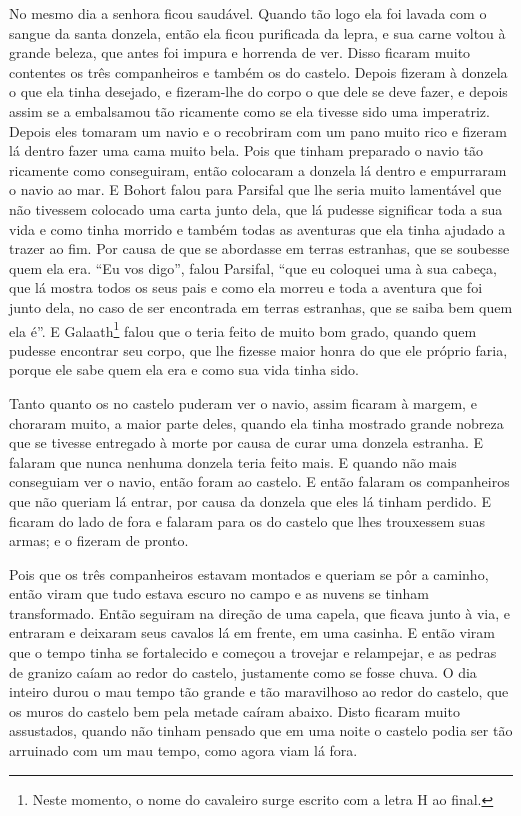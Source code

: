 No mesmo dia a senhora ficou saudável. Quando tão logo ela foi lavada com o
sangue da santa donzela, então ela ficou purificada da lepra, e sua carne
voltou à grande beleza, que antes foi impura e horrenda de ver. Disso ficaram
muito contentes os três companheiros e também os do castelo. Depois fizeram à
donzela o que ela tinha desejado, e fizeram-lhe do corpo o que dele se deve
fazer, e depois assim se a embalsamou tão ricamente como se ela tivesse sido
uma imperatriz. Depois eles tomaram um navio e o recobriram com um pano muito
rico e fizeram lá dentro fazer uma cama muito bela. Pois que tinham preparado o
navio tão ricamente como conseguiram, então colocaram a donzela lá dentro e
empurraram o navio ao mar. E Bohort falou para Parsifal que lhe seria muito
lamentável que não tivessem colocado uma carta junto dela, que lá pudesse
significar toda a sua vida e como tinha morrido e também todas as aventuras que
ela tinha ajudado a trazer ao fim. Por causa de que se abordasse em terras
estranhas, que se soubesse quem ela era. “Eu vos digo”, falou Parsifal, “que
eu coloquei uma à sua cabeça, que lá mostra todos os seus pais e como ela
morreu e toda a aventura que foi junto dela, no caso de ser encontrada em
terras estranhas, que se saiba bem quem ela é”. E Galaath\footnote{ Neste
momento, o nome do cavaleiro surge escrito com a letra H ao final. 
} falou que o teria feito de muito bom grado, quando quem pudesse encontrar seu
corpo, que lhe fizesse maior honra do que ele próprio faria, porque ele sabe
quem ela era e como sua vida tinha sido.

Tanto quanto os no castelo puderam ver o navio, assim ficaram à margem, e
choraram muito, a maior parte deles, quando ela tinha mostrado grande nobreza
que se tivesse entregado à morte por causa de curar uma donzela estranha. E
falaram que nunca nenhuma donzela teria feito mais. E quando não mais
conseguiam ver o navio, então foram ao castelo. E então falaram os
companheiros que não queriam lá entrar, por causa da donzela que eles lá
tinham perdido. E ficaram do lado de fora e falaram para os do castelo que lhes
trouxessem suas armas; e o fizeram de pronto. 

Pois que os três companheiros estavam montados e queriam se pôr a caminho, então
viram que tudo estava escuro no campo e as nuvens se tinham transformado. Então
seguiram na direção de uma capela, que ficava junto à via, e entraram e
deixaram seus cavalos lá em frente, em uma casinha. E então viram que o tempo
tinha se fortalecido e começou a trovejar e relampejar, e as pedras de granizo
caíam ao redor do castelo, justamente como se fosse chuva. O dia inteiro durou
o mau tempo tão grande e tão maravilhoso ao redor do castelo, que os muros do
castelo bem pela metade caíram abaixo. Disto ficaram muito assustados, quando
não tinham pensado que em uma noite o castelo podia ser tão arruinado com um
mau tempo, como agora viam lá fora.

